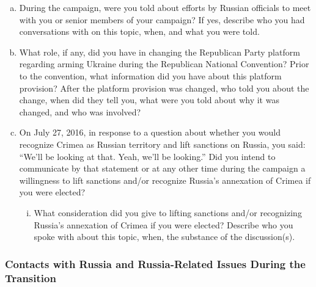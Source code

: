 \begin{enumerate}[a.]
\item During the campaign, were you told about efforts by Russian officials to meet with you or senior members of your campaign?
If yes, describe who you had conversations with on this topic, when, and what you were told.

\item What role, if any, did you have in changing the Republican Party platform regarding arming Ukraine during the Republican National Convention?
Prior to the convention, what information did you have about this platform provision?
After the platform provision was changed, who told you about the change, when did they tell you, what were you told about why it was changed, and who was involved?

\item On July 27, 2016, in response to a question about whether you would recognize Crimea as Russian territory and lift sanctions on Russia, you said: “We'll be looking at that. Yeah, we'll be looking.”
Did you intend to communicate by that statement or at any other time during the campaign a willingness to lift sanctions and/or recognize Russia’s annexation of Crimea if you were elected?

\begin{enumerate}[i.]

\item What consideration did you give to lifting sanctions and/or recognizing Russia’s annexation of Crimea if you were elected?
Describe who you spoke with about this topic, when, the substance of the discussion(s).

\end{enumerate}

\end{enumerate}

\subsubsection{Contacts with Russia and Russia-Related Issues During the Transition}

